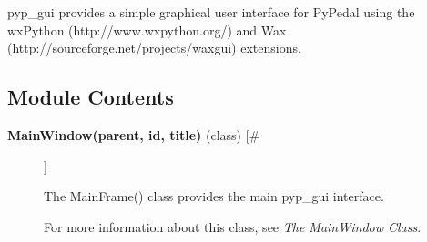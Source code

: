 \par pyp\_gui provides a simple graphical user interface for PyPedal using the wxPython
(http://www.wxpython.org/) and Wax (http://sourceforge.net/projects/waxgui) extensions.
\subsection*{Module Contents}
\begin{description}
\item[\textbf{MainWindow(parent, id, title)} (class) [\#]
]
\par The MainFrame() class provides the main pyp\_gui interface.
\par For more information about this class, see \textit{The MainWindow Class}.

\end{description}
